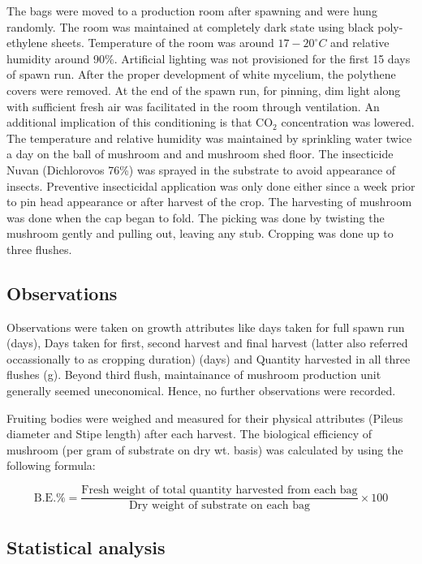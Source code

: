 \documentclass[]{article}
\begin{document}
The bags were moved to a production room after spawning and were hung randomly. The room was maintained at completely dark state using black poly-ethylene sheets. Temperature of the room was around \(17-20^\circ C\) and relative humidity around 90\%. Artificial lighting was not provisioned for the first 15 days of spawn run. After the proper development of white mycelium, the polythene covers were removed. At the end of the spawn run, for pinning, dim light along with sufficient fresh air was facilitated in the room through ventilation. An additional implication of this conditioning is that \(\mathrm{CO_2}\) concentration was lowered. The temperature and relative humidity was maintained by sprinkling water twice a day on the ball of mushroom and and mushroom shed floor. The insecticide Nuvan (Dichlorovos 76\%) was sprayed in the substrate to avoid appearance of insects. Preventive insecticidal application was only done either since a week prior to pin head appearance or after harvest of the crop. The harvesting of mushroom was done when the cap began to fold. The picking was done by twisting the mushroom gently and pulling out, leaving any stub. Cropping was done up to three flushes.

\hypertarget{observations}{%
\subsection{Observations}\label{observations}}

Observations were taken on growth attributes like days taken for full spawn run (days), Days taken for first, second harvest and final harvest (latter also referred occassionally to as cropping duration) (days) and Quantity harvested in all three flushes (g). Beyond third flush, maintainance of mushroom production unit generally seemed uneconomical. Hence, no further observations were recorded.

Fruiting bodies were weighed and measured for their physical attributes (Pileus diameter and Stipe length) after each harvest. The biological efficiency of mushroom (per gram of substrate on dry wt. basis) was calculated by using the following formula:

\begin{equation}
\label{eqn:biological-eff}
\tag{a}
\textrm{B.E.} \% =\frac{\text{Fresh weight of total quantity harvested from each bag}}{\textrm{Dry weight of substrate on each bag}} \times 100
\end{equation}

\hypertarget{statistical-analysis}{%
\subsection{Statistical analysis}\label{statistical-analysis}}
\end{document}

